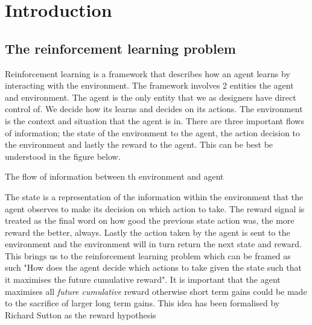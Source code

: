 \chapter{Introduction}\label{C:intro}

\section{The reinforcement learning problem}

Reinforcement learning is a framework that describes how an agent learns by interacting with the environment. The framework involves 2 entities the agent and environment. The agent is the only entity that we as designers have direct control of. We decide how its learns and decides on its actions. The environment is the context and situation that the agent is in. There are three important flows of information;  the state of the environment to the agent, the action decision to the environment and lastly the reward to the agent. This can be best be understood in the figure below.

\begin{fig}
\begin{center}
    \caption{The flow of information between th environment and agent}
\end{center}
\end{fig}

The state is a representation of the information within the environment that the agent observes to make its decision on which action to take. The reward signal is treated as the final word on how good the previous state action was, the more reward the better, always. Lastly the action taken by the agent is sent to the environment and the environment will in turn return the next state and reward. This brings us to the reinforcement learning problem which can be framed as such "How does the agent decide which actions to take given the state such that it maximises the future cumulative reward". It is important that the agent maximises all \textit{future cumulative} reward otherwise short term gains could be made to the sacrifice of larger long term gains. This idea has been formalised by Richard Sutton as the reward hypothesis

